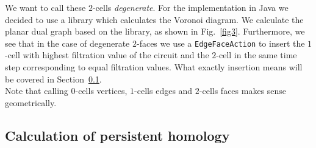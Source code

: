 \documentclass[11pt, a4paper, UKenglish]{article}
\begin{document}
    We want to call these $2$-cells \textit{degenerate}.
    For the implementation in Java we decided to use a library which calculates the Voronoi diagram.
    We calculate the planar dual graph based on the library, as shown in Fig.~\ref{fig3}.
    Furthermore, we see that in the case of degenerate $2$-faces we use a \texttt{EdgeFaceAction} to insert the $1$-cell with highest filtration value of the circuit and the $2$-cell in the same time step corresponding to equal filtration values.
    What exactly insertion means will be covered in Section~\ref{subsec:calculation-of-persistent-homology}.\\
    Note that calling $0$-cells vertices, $1$-cells edges and $2$-cells faces makes sense geometrically.

    \subsection{Calculation of persistent homology}\label{subsec:calculation-of-persistent-homology}
\end{document}
